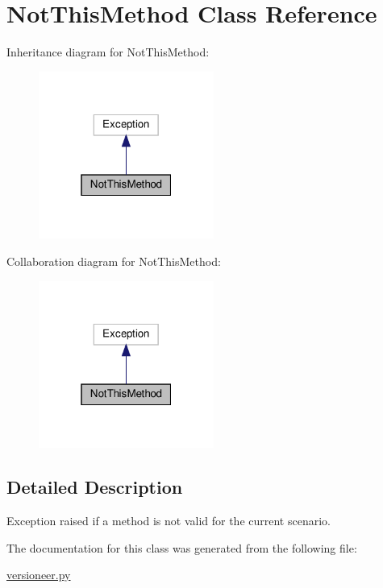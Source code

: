 \hypertarget{classversioneer_1_1NotThisMethod}{}\section{Not\+This\+Method Class Reference}
\label{classversioneer_1_1NotThisMethod}


Inheritance diagram for Not\+This\+Method\+:\nopagebreak
\begin{figure}[H]
\begin{center}
\leavevmode
\includegraphics[width=163pt]{classversioneer_1_1NotThisMethod__inherit__graph}
\end{center}
\end{figure}


Collaboration diagram for Not\+This\+Method\+:\nopagebreak
\begin{figure}[H]
\begin{center}
\leavevmode
\includegraphics[width=163pt]{classversioneer_1_1NotThisMethod__coll__graph}
\end{center}
\end{figure}


\subsection{Detailed Description}
\begin{DoxyVerb}Exception raised if a method is not valid for the current scenario.\end{DoxyVerb}
 

The documentation for this class was generated from the following file\+:\begin{DoxyCompactItemize}
\item 
\hyperlink{versioneer_8py}{versioneer.\+py}\end{DoxyCompactItemize}
